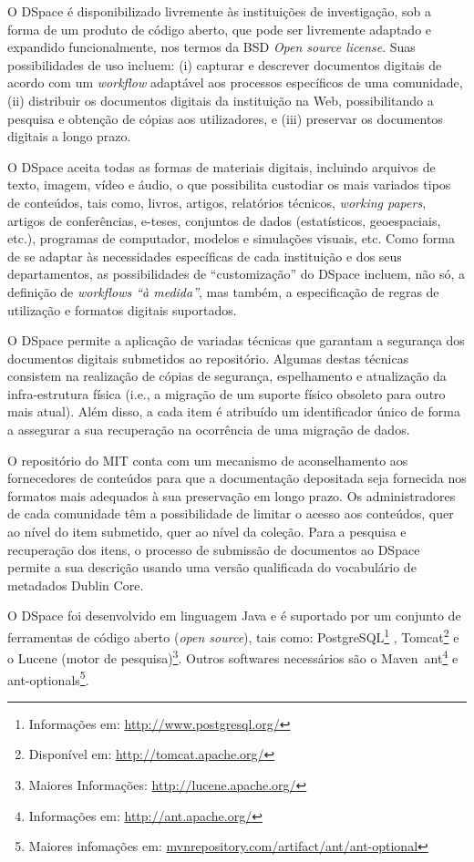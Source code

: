 O DSpace é disponibilizado livremente às instituições de investigação, sob a forma de um produto de código aberto, que pode ser livremente adaptado e expandido funcionalmente, nos termos da BSD \textit{Open source license}. Suas possibilidades de uso incluem: (i) capturar e descrever documentos digitais de acordo com um \textit{workflow} adaptável aos processos específicos de uma comunidade, (ii) distribuir os documentos digitais da instituição na Web, possibilitando a pesquisa e obtenção de cópias aos utilizadores, e (iii) preservar os documentos digitais a longo prazo.

O DSpace aceita todas as formas de materiais digitais, incluindo arquivos de texto, imagem, vídeo e áudio, o que possibilita custodiar os mais variados tipos de conteúdos, tais como, livros, artigos, relatórios técnicos, \textit{working papers}, artigos de conferências, e-teses, conjuntos de dados (estatísticos, geoespaciais, etc.), programas de computador, modelos e simulações visuais, etc. Como forma de se adaptar às necessidades específicas de cada instituição e dos seus departamentos, as possibilidades de “customização” do DSpace incluem, não só, a definição de \textit{workflows “à medida”}, mas também, a especificação de regras de utilização e formatos digitais suportados.

O DSpace permite a aplicação de variadas técnicas que garantam a segurança dos documentos digitais submetidos ao repositório. Algumas destas técnicas consistem na realização de cópias de segurança, espelhamento e atualização da infra-estrutura física (i.e., a migração de um suporte físico obsoleto para outro mais atual). Além disso, a cada item é atribuído um identificador único de forma a assegurar a sua recuperação na ocorrência de uma migração de dados.

O repositório do MIT conta com um mecanismo de aconselhamento aos fornecedores de conteúdos para que a documentação depositada seja fornecida nos formatos mais adequados à sua preservação em longo prazo. Os administradores de cada comunidade têm a possibilidade de limitar o acesso aos conteúdos, quer ao nível do item submetido, quer ao nível da coleção. Para a pesquisa e recuperação dos itens, o processo de submissão de documentos ao DSpace permite a sua descrição usando uma versão qualificada do vocabulário de metadados Dublin Core.

O DSpace foi desenvolvido em linguagem Java e é suportado por um conjunto de ferramentas de código aberto (\textit{open source}), tais como: PostgreSQL\footnote{Informações em: \url{http://www.postgresql.org/}} , Tomcat\footnote{Disponível em: \url{http://tomcat.apache.org/}} e o Lucene (motor de pesquisa)\footnote{Maiores Informações: \url{http://lucene.apache.org/}}. Outros softwares necessários são o Maven\, ant\footnote{Informações em: \url{http://ant.apache.org/}} e ant-optionals\footnote{Maiores infomações em: \url{mvnrepository.com/artifact/ant/ant-optional}}.
